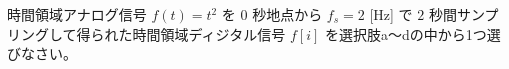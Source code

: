 時間領域アナログ信号 $f(t) = t^2$ を $0$ 秒地点から $f_s = 2$ [Hz] で $2$ 秒間サンプリングして得られた時間領域ディジタル信号 $f[i]$ を選択肢a〜dの中から1つ選びなさい。
